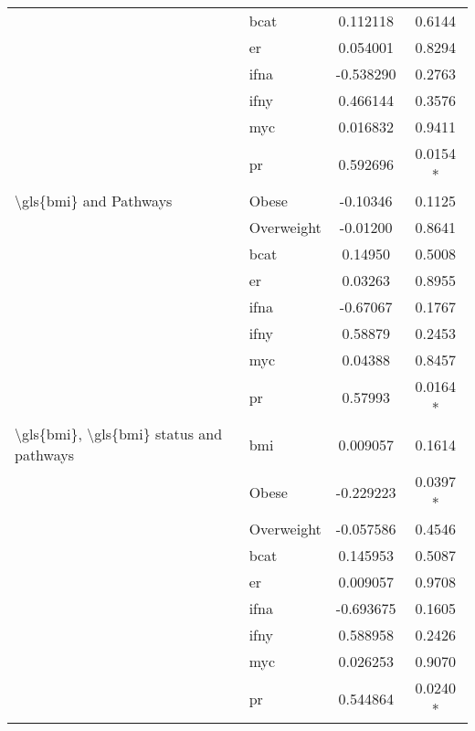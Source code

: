 \begin{table}[htpb]
\begin{tabular}{llcc}
                                                             & \gls{bcat} & 0.112118  & 0.6144     \\
                                                             & \gls{er}   & 0.054001  & 0.8294     \\
                                                             & \gls{ifna} & -0.538290 & 0.2763     \\
                                                             & \gls{ifny} & 0.466144  & 0.3576     \\
                                                             & myc        & 0.016832  & 0.9411     \\
                                                             & \gls{pr}   & 0.592696  & 0.0154   * \\
		\gls{\gls{bmi}} and Pathways                         & Obese      & -0.10346  & 0.1125     \\
                                                             & Overweight & -0.01200  & 0.8641     \\
                                                             & \gls{bcat} & 0.14950   & 0.5008     \\
                                                             & \gls{er}   & 0.03263   & 0.8955     \\
                                                             & \gls{ifna} & -0.67067  & 0.1767     \\
                                                             & \gls{ifny} & 0.58879   & 0.2453     \\
                                                             & myc        & 0.04388   & 0.8457     \\
                                                             & \gls{pr}   & 0.57993   & 0.0164   * \\
		\gls{\gls{bmi}}, \gls{\gls{bmi}} status and pathways & \gls{bmi}  & 0.009057  & 0.1614     \\
                                                             & Obese      & -0.229223 & 0.0397   * \\
                                                             & Overweight & -0.057586 & 0.4546     \\
                                                             & \gls{bcat} & 0.145953  & 0.5087     \\
                                                             & \gls{er}   & 0.009057  & 0.9708     \\
                                                             & \gls{ifna} & -0.693675 & 0.1605     \\
                                                             & \gls{ifny} & 0.588958  & 0.2426     \\
                                                             & myc        & 0.026253  & 0.9070     \\
                                                             & \gls{pr}   & 0.544864  & 0.0240   * \\


\end{tabular}
\end{table}
